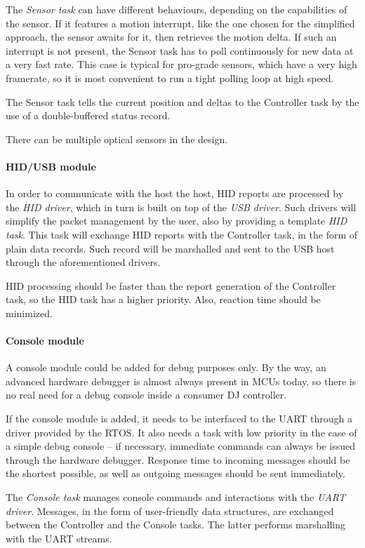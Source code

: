 \documentclass[a4paper,10pt]{article}
\begin{document}
\begin{multicols}{2}
The \emph{Sensor task} can have different behaviours, depending on the
capabilities of the sensor. If it features a motion interrupt, like the one
chosen for the simplified approach, the sensor awaits for it, then retrieves
the motion delta. If such an interrupt is not present, the Sensor task has to
poll continuously for new data at a very fast rate. This case is typical for
pro-grade sensors, which have a very high framerate, so it is most convenient
to run a tight polling loop at high speed.

The Sensor task tells the current position and deltas to the Controller task
by the use of a double-buffered status record.

There can be multiple optical sensors in the design.


\paragraph{HID/USB module}
In order to communicate with the host the host, HID reports are processed by
the \emph{HID driver}, which in turn is built on top of the \emph{USB driver}.
Such drivers will simplify the packet management by the user, also by
providing a template \emph{HID task}. This task will exchange HID reports
with the Controller task, in the form of plain data records. Such record will
be marshalled and sent to the USB host through the aforementioned drivers.

HID processing should be faster than the report generation of the Controller
task, so the HID task has a higher priority. Also, reaction time should be
minimized.


\paragraph{Console module}
A console module could be added for debug purposes only. By the way, an
advanced hardware debugger is almost always present in MCUs today, so there is
no real need for a debug console inside a consumer DJ controller.

If the console module is added, it needs to be interfaced to the UART through
a driver provided by the RTOS. It also needs a task with low priority in the
case of a simple debug console -- if necessary, immediate commands can always
be issued through the hardware debugger. Response time to incoming messages
should be the shortest possible, as well as outgoing messages should be sent
immediately.

The \emph{Console task} manages console commands and interactions with the
\emph{UART driver}. Messages, in the form of user-friendly data structures,
are exchanged between the Controller and the Console tasks. The latter
performs marshalling with the UART streams. 



\end{multicols}
\end{document}
